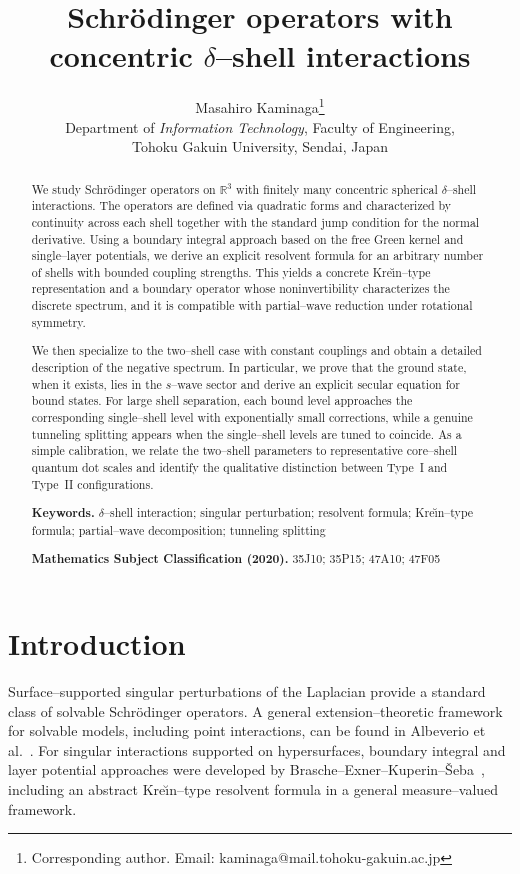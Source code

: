 \documentclass[a4paper,11pt]{article}
\title{Schr\"odinger operators with concentric $\delta$--shell interactions}
\author{%
Masahiro Kaminaga\thanks{Corresponding author. Email: kaminaga@mail.tohoku-gakuin.ac.jp}\\
{\small Department of \textit{Information Technology}, Faculty of Engineering,}\\
{\small Tohoku Gakuin University, Sendai, Japan}\\
}
\date{}
\numberwithin{equation}{section}
\theoremstyle{definition}
\theoremstyle{remark}
\begin{document}
\maketitle

\begin{abstract}
We study Schr\"odinger operators on $\mathbb R^3$ with finitely many concentric spherical $\delta$--shell interactions.
The operators are defined via quadratic forms and characterized by continuity across each shell together with the standard jump condition for the normal derivative.
Using a boundary integral approach based on the free Green kernel and single--layer potentials, we derive an explicit resolvent formula for an arbitrary number of shells with bounded coupling strengths.
This yields a concrete Kre\u{\i}n--type representation and a boundary operator whose noninvertibility characterizes the discrete spectrum, and it is compatible with partial--wave reduction under rotational symmetry.

We then specialize to the two--shell case with constant couplings and obtain a detailed description of the negative spectrum.
In particular, we prove that the ground state, when it exists, lies in the $s$--wave sector and derive an explicit secular equation for bound states.
For large shell separation, each bound level approaches the corresponding single--shell level with exponentially small corrections, while a genuine tunneling splitting appears when the single--shell levels are tuned to coincide.
As a simple calibration, we relate the two--shell parameters to representative core--shell quantum dot scales and identify the qualitative distinction between Type~I and Type~II configurations.


\medskip
\noindent\textbf{Keywords.}
$\delta$--shell interaction; singular perturbation; resolvent formula; Kre\u{\i}n--type formula; partial--wave decomposition; tunneling splitting

\medskip
\noindent\textbf{Mathematics Subject Classification (2020).}
35J10; 35P15; 47A10; 47F05
\end{abstract}





\section{Introduction}\label{sec:intro}

Surface--supported singular perturbations of the Laplacian 
provide a standard class of solvable Schr\"odinger operators. 
A general extension--theoretic framework for solvable models,
including point interactions, can be found in
Albeverio et al.~\cite{AGHH}.
For singular interactions supported on hypersurfaces,
boundary integral and layer potential approaches were developed by
Brasche--Exner--Kuperin--\v{S}eba~\cite{BrascheExnerKuperinSeba1994},
including an abstract Kre\u{\i}n--type resolvent formula in a general
measure--valued framework.
\end{document}
